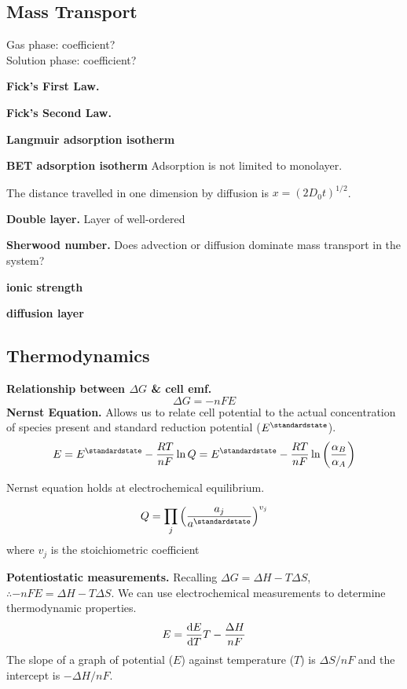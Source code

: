 \subsection*{Mass Transport}

Gas phase: coefficient? \\
Solution phase: coefficient?

\textbf{Fick's First Law.}

\textbf{Fick's Second Law.}

\textbf{Langmuir adsorption isotherm}

\textbf{BET adsorption isotherm}
Adsorption is not limited to monolayer.

The distance travelled in one dimension by diffusion is $x = (2D_0t)^{1/2}$.

\textbf{Double layer.} Layer of well-ordered

\textbf{Sherwood number.} Does advection or diffusion dominate mass transport in the system?

\textbf{ionic strength}

\textbf{diffusion layer}

\subsection*{Thermodynamics}
\textbf{Relationship between $\Delta G$ \& cell emf.}
\begin{equation*}
    \Delta G = -nFE
\end{equation*}
\textbf{Nernst Equation.} Allows us to relate cell potential to the actual concentration of species
present and standard reduction potential ($E^\standardstate$).
\begin{equation*}
    E = E^\standardstate - \frac{RT}{nF} \ln Q = E^\standardstate - \frac{RT}{nF} \ln\left(\frac{\alpha_B}{\alpha_A}\right)
\end{equation*}

Nernst equation holds at electrochemical equilibrium.

\begin{equation*}
    Q = \prod_j \left(\frac{a_j}{a^\standardstate}\right)^{v_j}
\end{equation*}
where $v_j$ is the stoichiometric coefficient

\textbf{Potentiostatic measurements.} Recalling $\Delta G = \Delta H - T \Delta S$, 
$ \therefore - nFE = \Delta H - T \Delta S$. We can use electrochemical measurements to determine
thermodynamic properties.
\begin{equation*}
    E = \dv{E}{T}T - \frac{\Delta H}{nF}
\end{equation*} The slope of a graph of potential ($E$) against temperature ($T$)
is $\Delta S / nF$ and the intercept is $- \Delta H / nF$.

